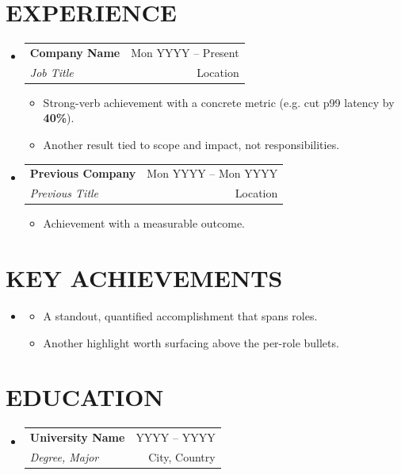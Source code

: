 \documentclass[letterpaper,11pt]{article}
\makeatletter
\newcommand{\resumeItem}[1]{
  \item\small{{#1 \vspace{-1pt}}}
}
\newcommand{\resumeSubheading}[4]{
  \vspace{-1pt}\item
    \begin{tabular*}{\textwidth}[t]{l@{\extracolsep{\fill}}r}
      \textbf{#1} & {\color{dark-grey}\small #2}\vspace{1pt}\\
      \textit{#3} & {\color{dark-grey}\small #4}\\
    \end{tabular*}\vspace{-4pt}
}
\newcommand{\resumeSubHeadingListStart}{\begin{itemize}[leftmargin=0in, label={}]}
\newcommand{\resumeSubHeadingListEnd}{\end{itemize}}
\newcommand{\resumeItemListStart}{\begin{itemize}[leftmargin=18pt]}
\newcommand{\resumeItemListEnd}{\end{itemize}\vspace{0pt}}
\makeatother
\begin{document}
\section{EXPERIENCE}
\resumeSubHeadingListStart
    \resumeSubheading
      {Company Name}{Mon YYYY -- Present}
      {Job Title}{Location}
      \resumeItemListStart
        \resumeItem{Strong-verb achievement with a concrete metric (e.g. cut p99 latency by \textbf{40\%}).}
        \resumeItem{Another result tied to scope and impact, not responsibilities.}
      \resumeItemListEnd

    \resumeSubheading
      {Previous Company}{Mon YYYY -- Mon YYYY}
      {Previous Title}{Location}
      \resumeItemListStart
        \resumeItem{Achievement with a measurable outcome.}
      \resumeItemListEnd
\resumeSubHeadingListEnd

\section{KEY ACHIEVEMENTS}
\resumeSubHeadingListStart
  \item[]
    \resumeItemListStart
      \resumeItem{A standout, quantified accomplishment that spans roles.}
      \resumeItem{Another highlight worth surfacing above the per-role bullets.}
    \resumeItemListEnd
\resumeSubHeadingListEnd

\section{EDUCATION}
\resumeSubHeadingListStart
    \resumeSubheading
      {University Name}{YYYY -- YYYY}
      {Degree, Major}{City, Country}
\resumeSubHeadingListEnd

\end{document}
